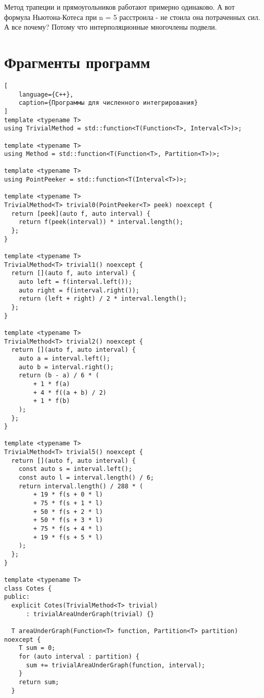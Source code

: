 \documentclass{article}
\begin{document}
Метод трапеции и прямоугольников работают примерно одинаково.
А вот формула Ньютона-Котеса при n = 5 расстроила - не
стоила она потраченных сил. А все почему? Потому что
интерполяционные многочлены подвели.

\section{Фрагменты программ}

\begin{lstlisting}[
    language={C++},
    caption={Программы для численного интегрирования}
]
template <typename T>
using TrivialMethod = std::function<T(Function<T>, Interval<T>)>;

template <typename T>
using Method = std::function<T(Function<T>, Partition<T>)>;

template <typename T>
using PointPeeker = std::function<T(Interval<T>)>;

template <typename T>
TrivialMethod<T> trivial0(PointPeeker<T> peek) noexcept {
  return [peek](auto f, auto interval) {
    return f(peek(interval)) * interval.length();
  };
}

template <typename T>
TrivialMethod<T> trivial1() noexcept {
  return [](auto f, auto interval) {
    auto left = f(interval.left());
    auto right = f(interval.right());
    return (left + right) / 2 * interval.length();
  };
}

template <typename T>
TrivialMethod<T> trivial2() noexcept {
  return [](auto f, auto interval) {
    auto a = interval.left();
    auto b = interval.right();
    return (b - a) / 6 * (
        + 1 * f(a) 
        + 4 * f((a + b) / 2) 
        + 1 * f(b)
    );
  };
}

template <typename T>
TrivialMethod<T> trivial5() noexcept {
  return [](auto f, auto interval) {
    const auto s = interval.left();
    const auto l = interval.length() / 6;
    return interval.length() / 288 * (                     
        + 19 * f(s + 0 * l)
        + 75 * f(s + 1 * l) 
        + 50 * f(s + 2 * l) 
        + 50 * f(s + 3 * l) 
        + 75 * f(s + 4 * l) 
        + 19 * f(s + 5 * l) 
    );
  };
}

template <typename T>
class Cotes {
public:
  explicit Cotes(TrivialMethod<T> trivial)
      : trivialAreaUnderGraph(trivial) {}

  T areaUnderGraph(Function<T> function, Partition<T> partition) noexcept {
    T sum = 0;
    for (auto interval : partition) {
      sum += trivialAreaUnderGraph(function, interval);
    }
    return sum;
  }


\end{lstlisting}
\end{document}
